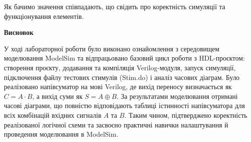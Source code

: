 \documentclass[12pt,a4paper]{article}
\begin{document}
    Як бачимо значення співпадають, що свідить про коректність симуляції та функціонування елементів.

    \begin{center} \textbf{\Large Висновок} \end{center}

    У ході лабораторної роботи було виконано ознайомлення з середовищем моделювання ModelSim та відпрацьовано базовий цикл роботи з HDL-проєктом: створення проєкту, додавання та компіляція Verilog-модуля, запуск симуляції, підключення файлу тестових стимулів (Stim.do) і аналіз часових діаграм. Було реалізовано напівсуматор на мові Verilog, де вихід переносу визначається як $C=A\cdot B$, а вихід суми як $S=A\oplus B$. За результатами моделювання отримані часові діаграми, що повністю відповідають таблиці істинності напівсуматора для всіх комбінацій вхідних сигналів $A$ та $B$. Таким чином, підтверджено коректність реалізованої логічної схеми та засвоєно практичні навички налаштування й проведення моделювання в ModelSim.
\end{document}
